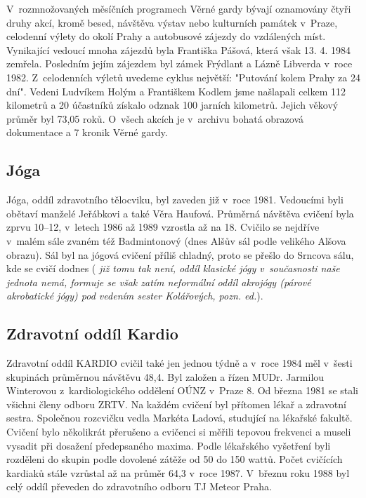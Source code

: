 \documentclass[a5paper, 11pt, twoside]{article}
\newcommand{\pozned}[1]{%
\textit{#1}}
\begin{document}
V~rozmnožovaných měsíčních programech Věrné gardy bývají oznamovány
čtyři druhy akcí, kromě besed, návštěva výstav nebo kulturních památek
v~Praze, celodenní výlety do okolí Prahy a autobusové zájezdy do
vzdálených míst. Vynikající vedoucí mnoha zájezdů byla Františka Pášová,
která však 13. 4. 1984 zemřela. Posledním jejím zájezdem byl zámek
Frýdlant a Lázně Libverda v~roce 1982. Z~celodenních výletů uvedeme
cyklus největší: "Putování kolem Prahy za 24 dní". Vedeni Ludvíkem
Holým a Františkem Kodlem jsme našlapali celkem 112 kilometrů a 20
účastníků získalo odznak 100 jarních kilometrů. Jejich věkový průměr byl
73,05 roků. O~všech akcích je v~archivu bohatá obrazová dokumentace a 7
kronik Věrné gardy.

\subsection{Jóga}

Jóga, oddíl zdravotního tělocviku, byl zaveden již v~roce 1981.
Vedoucími byli obětaví manželé Jeřábkovi a také Věra Haufová. Průměrná
návštěva cvičení byla zprvu 10--12, v~letech 1986 až 1989 vzrostla až na
18. Cvičilo se nejdříve v~malém sále zvaném též Badmintonový (dnes Alšův
sál podle velikého Alšova obrazu). Sál byl na jógová cvičení příliš
chladný, proto se přešlo do Srncova sálu, kde se cvičí dodnes (\pozned{již
tomu tak není, oddíl klasické jógy v~současnosti naše jednota nemá,
formuje se však zatím neformální oddíl akrojógy (párové akrobatické
jógy) pod vedením sester Kolářových, pozn. ed.}).

\subsection{Zdravotní oddíl Kardio}

Zdravotní oddíl KARDIO cvičil také jen jednou týdně a v~roce 1984 měl
v~šesti skupinách průměrnou návštěvu 48,4. Byl založen a řízen MUDr.
Jarmilou Winterovou z~kardiologického oddělení OÚNZ v~Praze 8. Od března
1981 se stali všichni členy odboru ZRTV. Na každém cvičení byl přítomen
lékař a zdravotní sestra. Společnou rozcvičku vedla Markéta Ladová,
studující na lékařské fakultě. Cvičení bylo několikrát přerušeno a
cvičenci si měřili tepovou frekvenci a museli vysadit při dosažení
předepsaného maxima. Podle lékařského vyšetření byli rozděleni do skupin
podle dovolené zátěže od 50 do 150 wattů. Počet cvičících kardiaků stále
vzrůstal až na průměr 64,3 v~roce 1987. V~březnu roku 1988 byl celý
oddíl převeden do zdravotního odboru TJ Meteor Praha.
\end{document}

